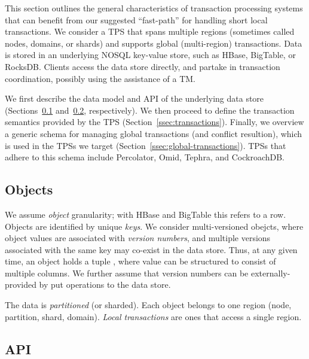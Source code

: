 
This section outlines the general characteristics of transaction processing systems that can benefit from our 
suggested ``fast-path'' for handling short local transactions. 
We consider a TPS  that spans multiple regions (sometimes called nodes, domains, or shards) and supports global
(multi-region) transactions. Data is stored in an underlying NOSQL key-value store, such as HBase, BigTable,  or
RocksDB. Clients access the data store directly, and partake in transaction
coordination, possibly using the assistance of a TM.

We first describe the data model and API of the underlying data store (Sections~\ref{ssec:data-model}
and~\ref{ssec:api}, respectively). We then proceed to define  the transaction semantics provided by the TPS
(Section~\ref{ssec:transactions}). Finally, we overview a generic schema for managing global transactions 
(and conflict resultion), which is used in the TPSs we target (Section~\ref{ssec:global-transactions}).
TPSs that adhere to this schema include Percolator, Omid, Tephra, and CockroachDB.

\subsection{Objects}
\label{ssec:data-model}

We assume \emph{object} granularity; with HBase and BigTable this refers to a row.
Objects are identified by unique \emph{keys}.  
We consider multi-versioned obejcts, where object values are associated with \emph{version numbers}, and
multiple versions associated with the same key may co-exist in the data store.
Thus, at any given time, an object holds a tuple , where value
can be structured to consist of multiple columns.
We further assume that version numbers can be externally-provided by put operations to the data store.

The data is \emph{partitioned} (or sharded). Each object belongs to one region
(node, partition, shard, domain). \emph{Local transactions} are ones that access
a single region.

\subsection{API} \label{ssec:api}

